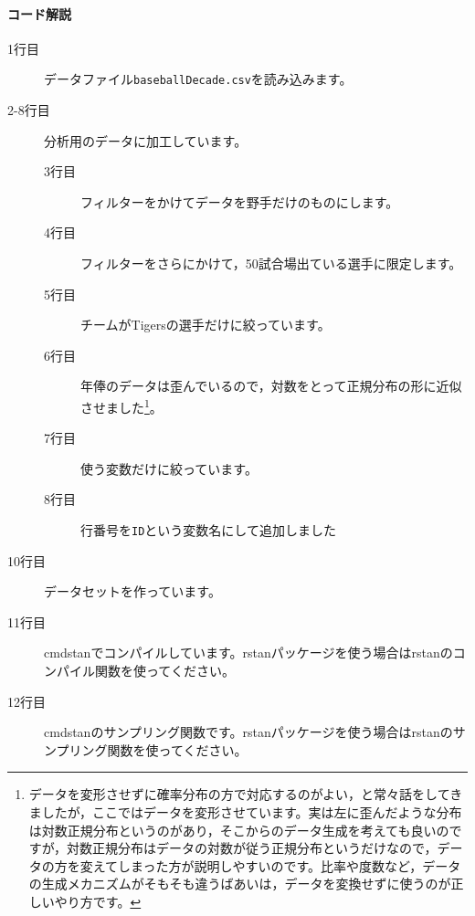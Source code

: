 \documentclass{ltjsbook}
\begin{document}
\paragraph{コード解説}
\begin{description}
	\item[1行目] データファイル\verb|baseballDecade.csv|を読み込みます。
	\item[2-8行目] 分析用のデータに加工しています。
	      \begin{description}
		      \item[3行目] フィルターをかけてデータを野手だけのものにします。
		      \item[4行目] フィルターをさらにかけて，50試合場出ている選手に限定します。
		      \item[5行目] チームがTigersの選手だけに絞っています。
		      \item[6行目] 年俸のデータは歪んでいるので，対数をとって正規分布の形に近似させました\footnote{データを変形させずに確率分布の方で対応するのがよい，と常々話をしてきましたが，ここではデータを変形させています。実は左に歪んだような分布は対数正規分布というのがあり，そこからのデータ生成を考えても良いのですが，対数正規分布はデータの対数が従う正規分布というだけなので，データの方を変えてしまった方が説明しやすいのです。比率や度数など，データの生成メカニズムがそもそも違うばあいは，データを変換せずに使うのが正しいやり方です。}。
		      \item[7行目] 使う変数だけに絞っています。
		      \item[8行目] 行番号を\verb|ID|という変数名にして追加しました
	      \end{description}
	\item[10行目] データセットを作っています。
	\item[11行目] cmdstanでコンパイルしています。rstanパッケージを使う場合はrstanのコンパイル関数を使ってください。
	\item[12行目] cmdstanのサンプリング関数です。rstanパッケージを使う場合はrstanのサンプリング関数を使ってください。
\end{description}
\end{document}
